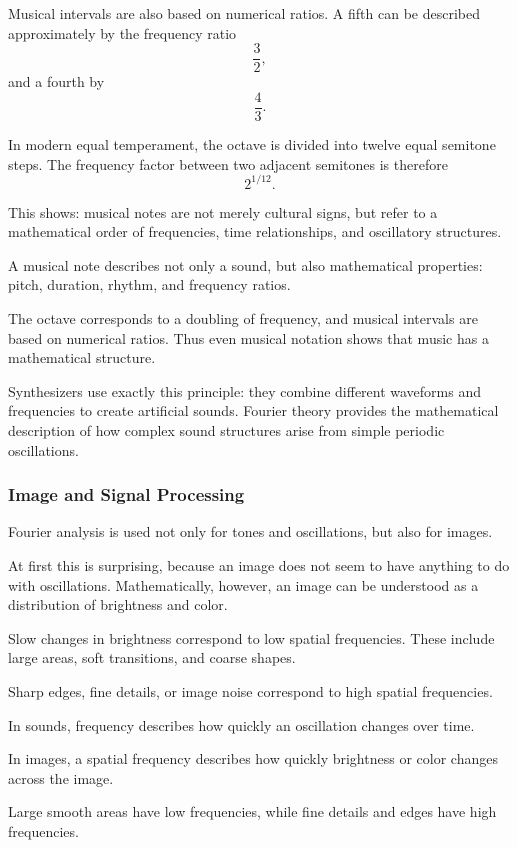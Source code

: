 Musical intervals are also based on numerical ratios.
A fifth can be described approximately by the frequency ratio
\[
\frac{3}{2},
\]
and a fourth by
\[
\frac{4}{3}.
\]

In modern equal temperament, the octave is divided into twelve equal semitone steps.
The frequency factor between two adjacent semitones is therefore
\[
2^{1/12}.
\]

This shows:
musical notes are not merely cultural signs,
but refer to a mathematical order of frequencies,
time relationships, and oscillatory structures.

\begin{NoteBox}
	\small
	\label{box:Musiknoten}
	A musical note describes not only a sound,
	but also mathematical properties:
	pitch, duration, rhythm, and frequency ratios.
	
	The octave corresponds to a doubling of frequency,
	and musical intervals are based on numerical ratios.
	Thus even musical notation shows
	that music has a mathematical structure.
\end{NoteBox}

Synthesizers use exactly this principle:
they combine different waveforms and frequencies
to create artificial sounds.
Fourier theory provides the mathematical description
of how complex sound structures arise from simple periodic oscillations.

\subsubsection*{Image and Signal Processing}

Fourier analysis is used not only for tones and oscillations,
but also for images.

At first this is surprising,
because an image does not seem to have anything to do with oscillations.
Mathematically, however, an image can be understood as a distribution of brightness
and color.

Slow changes in brightness correspond to low spatial frequencies.
These include large areas,
soft transitions,
and coarse shapes.

Sharp edges,
fine details,
or image noise correspond to high spatial frequencies.

\begin{DidacticBox}
	\small
	\label{box:fourier-frequenzen-in-bildern}
	In sounds, frequency describes
	how quickly an oscillation changes over time.
	
	In images, a spatial frequency describes
	how quickly brightness or color changes across the image.
	
	Large smooth areas have low frequencies,
	while fine details and edges have high frequencies.
\end{DidacticBox}

